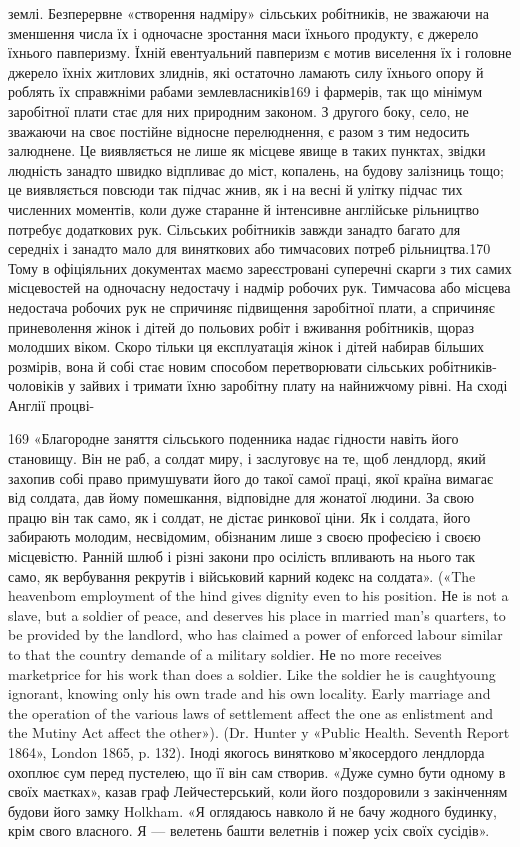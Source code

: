 землі. Безперервне «створення надміру» сільських робітників,
не зважаючи на зменшення числа їх і одночасне зростання маси
їхнього продукту, є джерело їхнього павперизму. Їхній евентуальний
павперизм є мотив виселення їх і головне джерело їхніх житлових
злиднів, які остаточно ламають силу їхнього опору й роблять
їх справжніми рабами землевласників169 і фармерів, так що мінімум
заробітної плати стає для них природним законом. З другого
боку, село, не зважаючи на своє постійне відносне перелюднення,
є разом з тим недосить залюднене. Це виявляється не лише як
місцеве явище в таких пунктах, звідки людність занадто швидко
відпливає до міст, копалень, на будову залізниць тощо; це виявляється
повсюди так підчас жнив, як і на весні й улітку підчас
тих численних моментів, коли дуже старанне й інтенсивне
англійське рільництво потребує додаткових рук. Сільських
робітників завжди занадто багато для середніх і занадто мало для
виняткових або тимчасових потреб рільництва.170 Тому в офіціяльних
документах маємо зареєстровані суперечні скарги з
тих самих місцевостей на одночасну недостачу і надмір робочих
рук. Тимчасова або місцева недостача робочих рук не спричиняє
підвищення заробітної плати, а спричиняє приневолення жінок
і дітей до польових робіт і вживання робітників, щораз молодших
віком. Скоро тільки ця експлуатація жінок і дітей набирав
більших розмірів, вона й собі стає новим способом перетворювати
сільських робітників-чоловіків у зайвих і тримати їхню
заробітну плату на найнижчому рівні. На сході Англії процві-

169 «Благородне заняття сільського поденника надає гідности навіть
його становищу. Він не раб, а солдат миру, і заслуговує на те, щоб лендлорд,
який захопив собі право примушувати його до такої самої праці,
якої країна вимагає від солдата, дав йому помешкання, відповідне для
жонатої людини. За свою працю він так само, як і солдат, не дістає ринкової
ціни. Як і солдата, його забирають молодим, несвідомим, обізнаним
лише з своєю професією і своєю місцевістю. Ранній шлюб і різні закони
про осілість впливають на нього так само, як вербування рекрутів і військовий
карний кодекс на солдата». («The heavenbom employment of
the hind gives dignity even to his position. Не is not a slave, but a soldier
of peace, and deserves his place in married man’s quarters, to be provided
by the landlord, who has claimed a power of enforced labour similar to that
the country demande of a military soldier. Не no more receives marketprice
for his work than does a soldier. Like the soldier he is caughtyoung
ignorant, knowing only his own trade and his own locality. Early marriage and
the operation of the various laws of settlement affect the one as enlistment
and the Mutiny Act affect the other»). (Dr. Hunter y «Public Health. Seventh
Report 1864», London 1865, p. 132). Іноді якогось винятково м’якосердого
лендлорда охоплює сум перед пустелею, що її він сам створив. «Дуже
сумно бути одному в своїх маєтках», казав граф Лейчестерський, коли
його поздоровили з закінченням будови його замку Holkham. «Я оглядаюсь
навколо й не бачу жодного будинку, крім свого власного. Я — велетень
башти велетнів і пожер усіх своїх сусідів».

